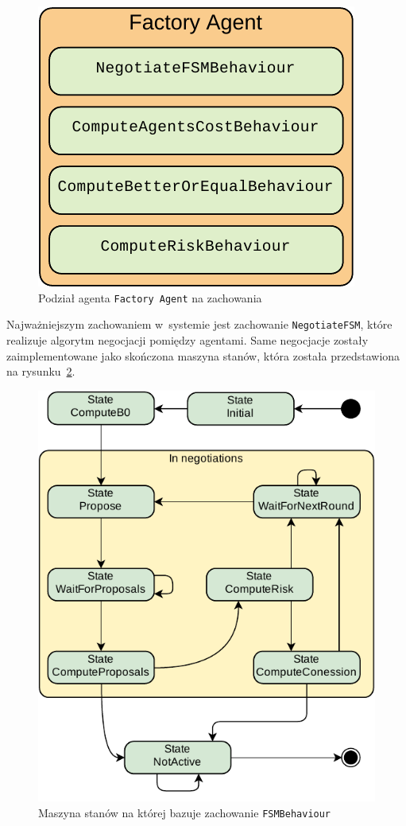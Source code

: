 \begin{figure}[h]
    \centering
    \includegraphics[width=0.8\columnwidth]{figures/SAG-Factory-Behaviours.pdf}
    \caption{Podział agenta \texttt{Factory Agent} na zachowania}
    \label{fig:factory-behaviours}
\end{figure}

Najważniejszym zachowaniem w~systemie jest zachowanie \texttt{NegotiateFSM}, które realizuje algorytm negocjacji pomiędzy agentami. Same negocjacje zostały zaimplementowane jako skończona maszyna stanów, która została przedstawiona na rysunku~\ref{fig:factory-fsm}.

\begin{figure}[h]
    \centering
    \includegraphics[width=\columnwidth]{figures/SAG-FactoryFSM.pdf}
    \caption{Maszyna stanów na której bazuje zachowanie \texttt{FSMBehaviour}}
    \label{fig:factory-fsm}
\end{figure}

